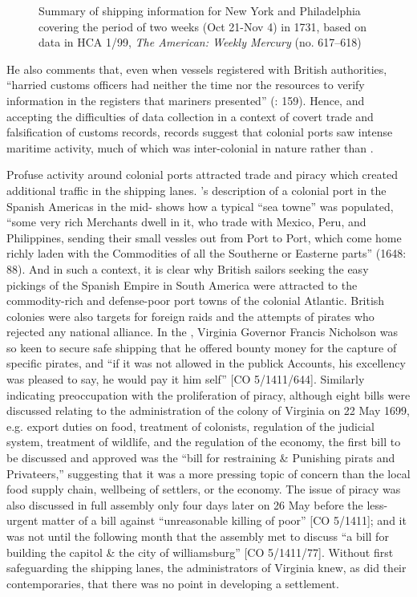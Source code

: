 \begin{figure}
\caption{\label{tab:key:4.3} Summary of shipping information for New York and Philadelphia covering the period of two weeks (Oct 21-Nov 4) in 1731, based on data in HCA 1/99, \textit{The American: Weekly Mercury} (no. 617--618)}
\end{figure}
 

He also comments that, even when vessels registered with British authorities, “harried customs officers had neither the time nor the resources to verify information in the registers that mariners presented” (\citealt{Jarvis2010}: 159). Hence, and accepting the difficulties of data collection in a context of covert trade and falsification of customs records, records suggest that colonial ports saw intense maritime activity, much of which was inter-colonial in nature rather than . 

Profuse activity around colonial ports attracted  trade and piracy which created additional traffic in the shipping lanes. \citeauthor{Gage1648}’s description of a colonial port in the Spanish Americas in the mid- shows how a typical “sea towne” was populated, “some very rich Merchants dwell in it, who trade with Mexico, Peru, and Philippines, sending their small vessles out from Port to Port, which come home richly laden with the Commodities of all the Southerne or Easterne parts” (1648: 88). And in such a context, it is clear why British sailors seeking the easy pickings of the Spanish Empire in South America were attracted to the commodity-rich and defense-poor port towns of the colonial Atlantic. British colonies were also targets for foreign raids and the attempts of pirates who rejected any national alliance. In the , Virginia Governor Francis Nicholson was so keen to secure safe shipping that he offered bounty money for the capture of specific pirates, and “if it was not allowed in the publick Accounts, his excellency was pleased to say, he would pay it him self” [CO 5/1411/644]. Similarly indicating preoccupation with the proliferation of piracy, although eight bills were discussed relating to the administration of the colony of Virginia on 22 May {1699}, e.g. export duties on food, treatment of colonists, regulation of the judicial system, treatment of wildlife, and the regulation of the economy, the first bill to be discussed and approved was the “bill for restraining \& Punishing pirats and Privateers,” suggesting that it was a more pressing topic of concern than the local food supply chain, wellbeing of settlers, or the economy. The issue of piracy was also discussed in full assembly only four days later on 26 May before the less-urgent matter of a bill against “unreasonable killing of poor” [CO 5/1411]; and it was not until the following month that the assembly met to discuss “a bill for building the capitol \& the city of williamsburg” [CO 5/1411/77]. Without first safeguarding the shipping lanes, the administrators of Virginia knew, as did their contemporaries, that there was no point in developing a settlement. 

